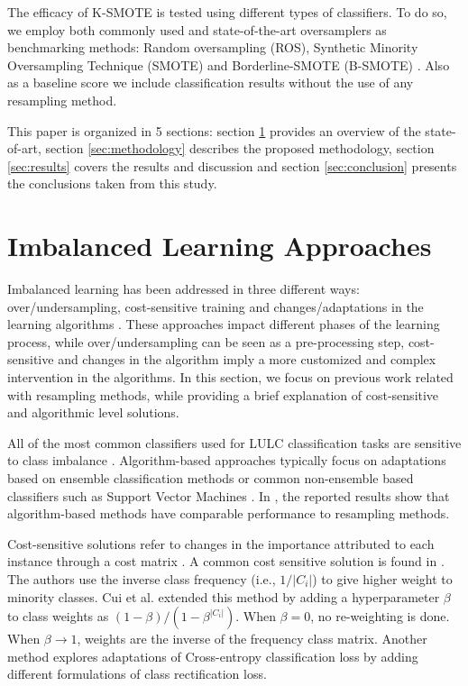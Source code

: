 \documentclass[remotesensing,article,submit,moreauthors,pdftex]{Definitions/mdpi}
\begin{document}
\begin{paracol}{2}
\linenumbers
\switchcolumn

The efficacy of K-SMOTE is tested using
different types of classifiers. To do so, we employ both commonly used and
state-of-the-art oversamplers as benchmarking methods: Random oversampling
(ROS), Synthetic Minority Oversampling Technique (SMOTE) \cite{Chawla2002} and
Borderline-SMOTE (B-SMOTE) \cite{Han2005}. Also as a baseline score we include
classification results without the use of any resampling method.

This paper is organized in 5 sections: section \ref{sec:sota} provides an
overview of the state-of-art, section \ref{sec:methodology} describes the
proposed methodology, section \ref{sec:results} covers the results and
discussion and section \ref{sec:conclusion} presents the conclusions taken from
this study.

\section{Imbalanced Learning Approaches} \label{sec:sota}

Imbalanced learning has been addressed in three different ways:
over/undersampling, cost-sensitive training and changes/adaptations in the
learning algorithms \cite{Kaur2019}. These approaches impact different
phases of the learning process, while over/undersampling can be seen as a
pre-processing step, cost-sensitive and changes in the algorithm imply a more
customized and complex intervention in the algorithms. In this
section, we focus on previous work related with resampling methods, while
providing a brief explanation of cost-sensitive and algorithmic level solutions.

All of the most common classifiers used for LULC classification tasks
\cite{Khatami2016, Gavade2019} are sensitive to class imbalance
\cite{Blagus2010}. Algorithm-based approaches typically focus on adaptations
based on ensemble classification methods \cite{Mellor2015} or common
non-ensemble based classifiers such as Support Vector Machines \cite{Shao2014}.
In \cite{Lee2016}, the reported results show that algorithm-based methods have
comparable performance to resampling methods.

Cost-sensitive solutions refer to changes in the importance attributed to each
instance through a cost matrix \cite{Huang2016,Cui2019,Dong2017}. A common cost
sensitive solution is found in \cite{Huang2016}. The authors use the inverse
class frequency (i.e., $1/|C_i|$) to give higher weight to minority classes. Cui
et al. \cite{Cui2019} extended this method by adding a hyperparameter $\beta$ to
class weights as $(1-\beta)/(1-\beta^{|C_i|})$. When $\beta=0$, no re-weighting
is done. When $\beta\rightarrow 1$, weights are the inverse of the frequency
class matrix. Another method \cite{Dong2017} explores adaptations of
Cross-entropy classification loss by adding different formulations of class
rectification loss.


\end{paracol}
\end{document}
